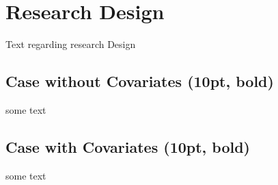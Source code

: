 \section{Research Design}
Text regarding research Design

\subsection{Case without Covariates (10pt, bold)}
some text

\subsection{Case with Covariates (10pt, bold)}
some text